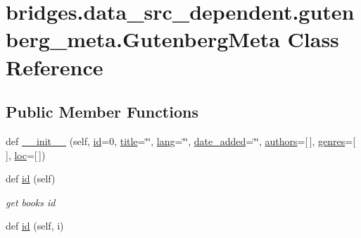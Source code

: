 \hypertarget{classbridges_1_1data__src__dependent_1_1gutenberg__meta_1_1_gutenberg_meta}{}\section{bridges.\+data\+\_\+src\+\_\+dependent.\+gutenberg\+\_\+meta.\+Gutenberg\+Meta Class Reference}
\label{classbridges_1_1data__src__dependent_1_1gutenberg__meta_1_1_gutenberg_meta}
\subsection*{Public Member Functions}
\begin{DoxyCompactItemize}
\item 
def \hyperlink{classbridges_1_1data__src__dependent_1_1gutenberg__meta_1_1_gutenberg_meta_ab3bf80ac6dedbf60329e2a1e879b2045}{\+\_\+\+\_\+init\+\_\+\+\_\+} (self, \hyperlink{classbridges_1_1data__src__dependent_1_1gutenberg__meta_1_1_gutenberg_meta_a8d3429925e3bda303e672b32e5728412}{id}=0, \hyperlink{classbridges_1_1data__src__dependent_1_1gutenberg__meta_1_1_gutenberg_meta_ab153eefa0661fa6f355045956166a4bf}{title}=\char`\"{}\char`\"{}, \hyperlink{classbridges_1_1data__src__dependent_1_1gutenberg__meta_1_1_gutenberg_meta_a2176ec26191cf831c5475a29a30d634e}{lang}=\char`\"{}\char`\"{}, \hyperlink{classbridges_1_1data__src__dependent_1_1gutenberg__meta_1_1_gutenberg_meta_af0b6cef7f9b2067fa9a8b4465b3b17d5}{date\+\_\+added}=\char`\"{}\char`\"{}, \hyperlink{classbridges_1_1data__src__dependent_1_1gutenberg__meta_1_1_gutenberg_meta_a6d855d7890d2058321310fbab782f5fd}{authors}=\mbox{[}$\,$\mbox{]}, \hyperlink{classbridges_1_1data__src__dependent_1_1gutenberg__meta_1_1_gutenberg_meta_a42df47578061b522d320da8da514ee6d}{genres}=\mbox{[}$\,$\mbox{]}, \hyperlink{classbridges_1_1data__src__dependent_1_1gutenberg__meta_1_1_gutenberg_meta_a657a3265c5a2e1770b85d78c259b6561}{loc}=\mbox{[}$\,$\mbox{]})
\item 
def \hyperlink{classbridges_1_1data__src__dependent_1_1gutenberg__meta_1_1_gutenberg_meta_a0a3c544667d9090773e9364f5a2e2b3c}{id} (self)
\begin{DoxyCompactList}\small\item\em get book\textquotesingle{}s id \end{DoxyCompactList}\item 
def \hyperlink{classbridges_1_1data__src__dependent_1_1gutenberg__meta_1_1_gutenberg_meta_ae4eb6694698d566d4f494f23f855efcc}{id} (self, i)

\end{DoxyCompactItemize}
